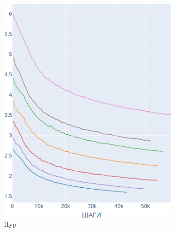 \documentclass{spbau-diploma}
\begin{document}
\begin{figure}[h]
\begin{subfigure}{.3\textwidth}
		\includegraphics[scale=0.2]{BooksCorpus_Hyp}
		\caption{Hyp}
		\label{fig:BooksCorpus_graphs_Hyp}
	\end{subfigure}\\
	\begin{subfigure}{.3\textwidth}
		\centering

\end{subfigure}
\end{figure}
\end{document}
